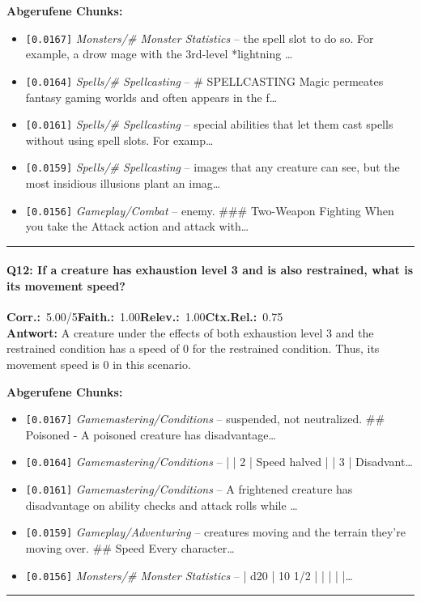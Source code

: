 \noindent\textbf{Abgerufene Chunks:}
\begin{itemize}[noitemsep, topsep=2pt]
  \item[\textbf{\#1}] \texttt{[0.0167]} \textit{Monsters/# Monster Statistics} -- the spell slot to do so. For example, a drow mage with the 3rd-level *lightning \ldots
  \item[\textbf{\#2}] \texttt{[0.0164]} \textit{Spells/# Spellcasting} -- \# SPELLCASTING  Magic permeates fantasy gaming worlds and often appears in the f\ldots
  \item[\textbf{\#3}] \texttt{[0.0161]} \textit{Spells/# Spellcasting} -- special abilities that let them cast spells without using spell slots. For examp\ldots
  \item[\textbf{\#4}] \texttt{[0.0159]} \textit{Spells/# Spellcasting} -- images that any creature can see, but the most insidious illusions plant an imag\ldots
  \item[\textbf{\#5}] \texttt{[0.0156]} \textit{Gameplay/Combat} -- enemy.  \#\#\# Two-Weapon Fighting  When you take the Attack action and attack with\ldots
\end{itemize}
\vspace{4pt}
\hrule
\vspace{6pt}

\paragraph{Q12: If a creature has exhaustion level 3 and is also restrained, what is its movement speed?}
\noindent \textbf{Corr.:}~5.00/5\quad \textbf{Faith.:}~1.00\quad \textbf{Relev.:}~1.00\quad \textbf{Ctx.Rel.:}~0.75\\

\noindent\textbf{Antwort:} A creature under the effects of both exhaustion level 3 and the restrained condition has a speed of 0 for the restrained condition. Thus, its movement speed is 0 in this scenario.

\noindent\textbf{Abgerufene Chunks:}
\begin{itemize}[noitemsep, topsep=2pt]
  \item[\textbf{\#1}] \texttt{[0.0167]} \textit{Gamemastering/Conditions} -- suspended, not neutralized.  \#\# Poisoned  - A poisoned creature has disadvantage\ldots
  \item[\textbf{\#2}] \texttt{[0.0164]} \textit{Gamemastering/Conditions} -- | | 2     | Speed halved                                   | | 3     | Disadvant\ldots
  \item[\textbf{\#3}] \texttt{[0.0161]} \textit{Gamemastering/Conditions} -- A frightened creature has disadvantage on ability checks and attack rolls while \ldots
  \item[\textbf{\#4}] \texttt{[0.0159]} \textit{Gameplay/Adventuring} -- creatures moving and the terrain they're moving over.  \#\# Speed  Every character\ldots
  \item[\textbf{\#5}] \texttt{[0.0156]} \textit{Monsters/# Monster Statistics} -- | d20     | 10 1/2             | |              |         |                    |\ldots
\end{itemize}
\vspace{4pt}
\hrule
\vspace{6pt}

